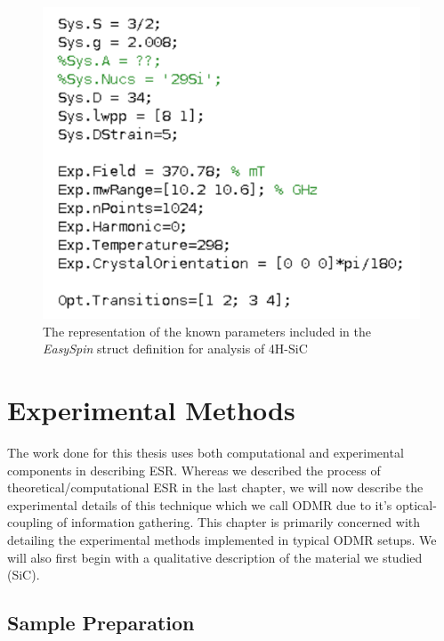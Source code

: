 \documentclass[oneside, noacknowlegments]{BYUPhys}
\begin{document}
\begin{figure}
    \centerline{\includegraphics{sic_params_commented_fig}}
    \caption[The \textit{EasySpin} Representation of SiC]{\label{fig:SiCParams}
     The representation of the known parameters included in the \textit{EasySpin} struct definition for analysis of 4H-SiC}
 \end{figure}
 










\chapter{Experimental Methods}

The work done for this thesis uses both computational and experimental components in describing ESR. Whereas we described the process of theoretical/computational ESR in the last chapter, we will now describe the experimental details of this technique which we call ODMR due to it's optical-coupling of information gathering. This chapter is primarily concerned with detailing the experimental methods implemented in typical ODMR setups. We will also first begin with a qualitative description of the material we studied (SiC).

\section{Sample Preparation}
\end{document}

